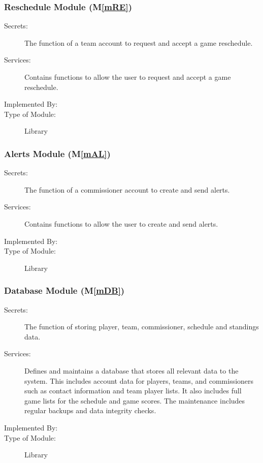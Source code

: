 \documentclass[12pt, titlepage]{article}
\newcommand{\mref}[1]{M\ref{#1}}
\begin{document}
\subsubsection{Reschedule Module (\mref{mRE})}

\begin{description}
  \item[Secrets:]The function of a team account to request and accept a game
  reschedule.
  \item[Services:]Contains functions to allow the user to request and accept a
  game reschedule.
  \item[Implemented By:] \progname{}
  \item[Type of Module:] Library
\end{description}

\subsubsection{Alerts Module (\mref{mAL})}

\begin{description}
  \item[Secrets:]The function of a commissioner account to create and send
  alerts.
  \item[Services:]Contains functions to allow the user to create and send alerts.
  \item[Implemented By:] \progname{}
  \item[Type of Module:] Library
\end{description}

\subsubsection{Database Module (\mref{mDB})}

\begin{description}
  \item[Secrets:]The function of storing player, team, commissioner, schedule
  and standings data.
  \item[Services:]Defines and maintains a database that stores all relevant data
  to the \progname{} system. This includes account data for players, teams, and
  commissioners such as contact information and team player lists. It also
  includes full game lists for the schedule and game scores. The maintenance
  includes regular backups and data integrity checks.
  \item[Implemented By:] \progname{}
  \item[Type of Module:] Library
\end{description}
\end{document}
